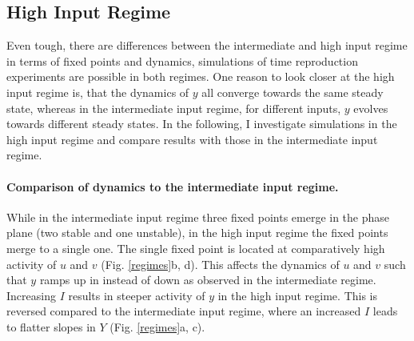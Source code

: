 \documentclass[10pt]{article}
\begin{document}
\subsection{High Input Regime}
Even tough, there are differences between the intermediate and high input regime in terms of fixed points and dynamics, simulations of time reproduction experiments are possible in both regimes. 
One reason to look closer at the high input regime is, that the dynamics of $y$ all converge towards the same steady state, whereas in the intermediate input regime, for different inputs, $y$ evolves towards different steady states. 
In the following, I investigate simulations in the high input regime and compare results with those in the intermediate input regime.

\paragraph{Comparison of dynamics to the intermediate input regime.}
While in the intermediate input regime three fixed points emerge in the phase plane (two stable and one unstable), in the high input regime the fixed points merge to a single one. 
The single fixed point is located at comparatively high activity of $u$ and $v$ 
(Fig. \ref{regimes}b, d).
This affects the dynamics of $u$ and $v$ such that $y$ ramps up in instead of down as observed in the intermediate regime. 
Increasing $I$ results in steeper activity of $y$ in the high input regime. This is reversed compared to the intermediate input regime, where an increased $I$ leads to flatter slopes in $Y$ (Fig. \ref{regimes}a, c). 
\end{document}
